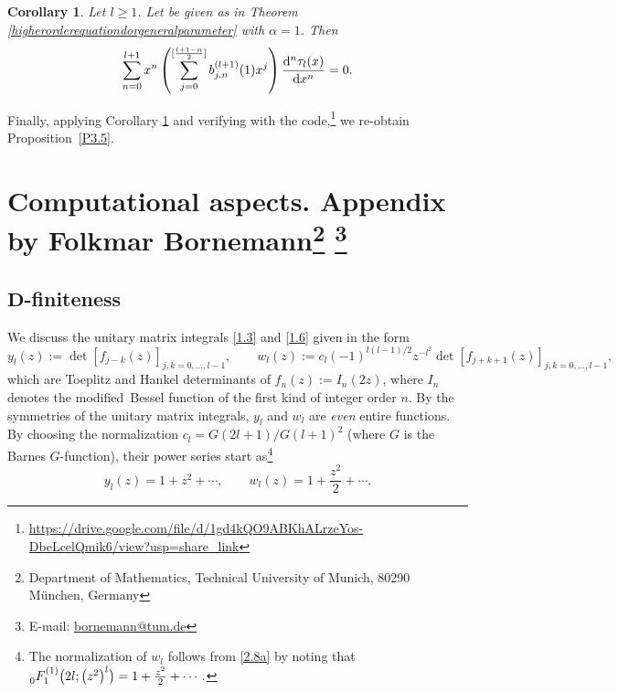 \documentclass[pdftex]{sigma}
\numberwithin{equation}{section}
\newtheorem{Corollary}[Theorem]{Corollary}
\theoremstyle{definition}
\begin{document}
\begin{Corollary}\label{altermethod}
Let $l\geq 1$. Let  be given as in Theorem {\rm\ref{higherorderequationdorgeneralparameter}} with $\alpha=1$. Then
\begin{equation*}
\sum_{n=0}^{l+1} x^n
\left(\sum_{j=0}^{[\frac{l+1-n}{2}]} b_{j,n}^{(l+1)}(1) x^j \right)
\frac{{\rm d}^n \tau_{l}(x)}{{\rm d}x^n} = 0.
\end{equation*}
\end{Corollary}
Finally, applying Corollary \ref{altermethod} and verifying with the code,\footnote{\url{https://drive.google.com/file/d/1gd4kQO9ABKhALrzeYos-DbeLcelQmik6/view?usp=share_link}} we re-obtain Proposition~\ref{P3.5}.

\renewcommand{\thefootnote}{$*$}

\section[Computational aspects. Appendix by Folkmar Bornemann]{Computational aspects. Appendix by Folkmar Bornemann\footnote{Department of Mathematics, Technical University of Munich, 80290 M\"unchen, Germany}\renewcommand{\thefootnote}{}
\footnote{E-mail: \href{mailto:bornemann@tum.de}{bornemann@tum.de}}}\label{appB}

\subsection[D-finiteness]{$\boldsymbol{D}$-finiteness}\label{appendixB1}

\newcommand{\C}{{\mathbb C}}
\newcommand{\Q}{{\mathbb Q}}
\newcommand{\Z}{{\mathbb Z}}

\renewcommand{\thefootnote}{\arabic{footnote}}
\setcounter{footnote}{5}

We discuss the unitary matrix integrals \eqref{1.3} and \eqref{1.6} given in the form
\[
y_l(z) := \det\left[ f_{j-k}(z)\right]_{j,k=0,\ldots,l-1},\qquad
w_l(z) := c_l(-1)^{l(l-1)/2}z^{-l^2} \det\left[ f_{j+k+1}(z)\right]_{j,k=0,\ldots,l-1},
\]
which are Toeplitz and Hankel determinants of
$
f_{n}(z) := I_n(2z)$,
where $I_n$ denotes the modified~Bessel function of the first kind of integer order $n$. By the symmetries of the unitary matrix integrals, $y_l$ and $w_l$ are {\em even} entire functions. By choosing the normalization $c_l = G(2l+1)/G(l+1)^2$ (where $G$ is the Barnes $G$-function), their power series start as\footnote{{The normalization of $w_l$ follows from \eqref{2.8a} by noting that $_0^{\mathstrut} F_1^{(1)}\bigl(2l; \bigl(z^2\bigr)^l\bigr) = 1 + \frac{z^2}{2} + \cdots.$}}
\[
y_l(z) = 1 + z^2 + \cdots, \qquad w_l(z) = 1 + \frac{z^2}{2} + \cdots.
\]
\end{document}
